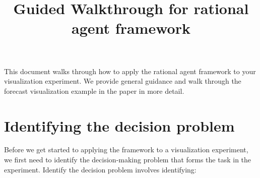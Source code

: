 \documentclass{article}
\title{Guided Walkthrough for rational agent framework}
\begin{document}
\maketitle




\begin{Schunk}
\end{Schunk}

This document walks through how to apply the rational agent framework to your visualization experiment. We provide general guidance and walk through the forecast visualization example in the paper in more detail.

\section{Identifying the decision problem}

Before we get started to applying the framework to a visualization experiment, we first need to identify the decision-making problem that forms the task in the experiment. Identify the decision problem involves identifying:
\end{document}

